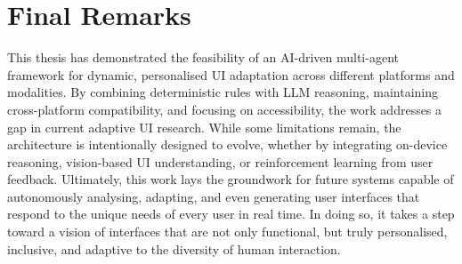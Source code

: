 \documentclass[openany]{book}
\begin{document}
\section{Final Remarks}
This thesis has demonstrated the feasibility of an AI-driven multi-agent framework for dynamic, personalised UI adaptation across different platforms and modalities. 
By combining deterministic rules with LLM reasoning, maintaining cross-platform compatibility, and focusing on accessibility, the work addresses a gap in current adaptive UI research. 
While some limitations remain, the architecture is intentionally designed to evolve, whether by integrating on-device reasoning, vision-based UI understanding, or reinforcement learning from user feedback.
Ultimately, this work lays the groundwork for future systems capable of autonomously analysing, adapting, and even generating user interfaces that respond to the unique needs of every user in real time. 
In doing so, it takes a step toward a vision of interfaces that are not only functional, but truly personalised, inclusive, and adaptive to the diversity of human interaction.


\printbibliography[title=References]
\end{document}
